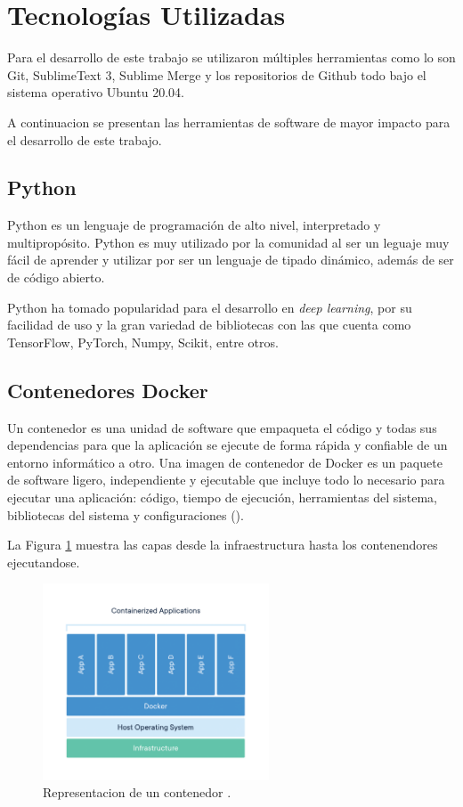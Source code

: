 \section{Tecnologías Utilizadas}

Para el desarrollo de este trabajo se utilizaron múltiples herramientas como lo son Git, SublimeText 3, Sublime Merge y los repositorios de Github todo bajo el sistema operativo Ubuntu 20.04.

A continuacion se presentan las herramientas de software de mayor impacto para el desarrollo de este trabajo.

\subsection{Python}

Python es un lenguaje de programación de alto nivel, interpretado y multipropósito. Python es muy utilizado por  la comunidad al ser un leguaje muy fácil de aprender y utilizar por ser un lenguaje de tipado dinámico, además de ser de código abierto.

Python ha tomado popularidad para el desarrollo en \textit{deep learning}, por su facilidad de uso y la gran variedad de bibliotecas con las que cuenta como TensorFlow, PyTorch, Numpy, Scikit, entre otros.

\subsection{Contenedores Docker}

Un contenedor es una unidad de software que empaqueta el código y todas sus dependencias para que la aplicación se ejecute de forma rápida y confiable de un entorno informático a otro. Una imagen de contenedor de Docker es un paquete de software ligero, independiente y ejecutable que incluye todo lo necesario para ejecutar una aplicación: código, tiempo de ejecución, herramientas del sistema, bibliotecas del sistema y configuraciones (\cite{docker2021container}).

La Figura \ref{fig:contenedorDocker} muestra las capas desde la infraestructura hasta los contenendores ejecutandose.

\begin{figure}[H]
    \centering
    \includegraphics[width=0.6\textwidth]{MarcoTeorico/imgs/container-what-is-container.png}
    \caption{Representacion de un contenedor \cite{docker2021container}.}
    \label{fig:contenedorDocker}
\end{figure}



